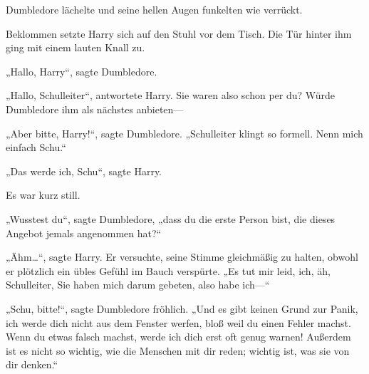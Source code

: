 Dumbledore lächelte und seine hellen Augen funkelten wie verrückt.

Beklommen setzte Harry sich auf den Stuhl vor dem Tisch. Die Tür hinter ihm ging mit einem lauten Knall zu.

„Hallo, Harry“, sagte Dumbledore.

„Hallo, Schulleiter“, antwortete Harry. Sie waren also schon per du? Würde Dumbledore ihm als nächstes anbieten—

„Aber bitte, Harry!“, sagte Dumbledore. „Schulleiter klingt so formell. Nenn mich einfach Schu.“

„Das werde ich, Schu“, sagte Harry.

Es war kurz still.

„Wusstest du“, sagte Dumbledore, „dass du die erste Person bist, die dieses Angebot jemals angenommen hat?“

„Ähm…“, sagte Harry. Er versuchte, seine Stimme gleichmäßig zu halten, obwohl er plötzlich ein übles Gefühl im Bauch verspürte. „Es tut mir leid, ich, äh, Schulleiter, Sie haben mich darum gebeten, also habe ich—“

„Schu, bitte!“, sagte Dumbledore fröhlich. „Und es gibt keinen Grund zur Panik, ich werde dich nicht aus dem Fenster werfen, bloß weil du einen Fehler machst. Wenn du etwas falsch machst, werde ich dich erst oft genug warnen! Außerdem ist es nicht so wichtig, wie die Menschen mit dir reden; wichtig ist, was sie von dir denken.“

